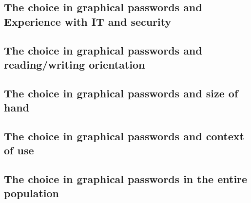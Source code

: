     \subsection*{The choice in graphical passwords and Experience with IT and security}

    \subsection*{The choice in graphical passwords and reading/writing orientation}

    \subsection*{The choice in graphical passwords and size of hand}

    \subsection*{The choice in graphical passwords and context of use}

    \subsection*{The choice in graphical passwords in the entire population}




